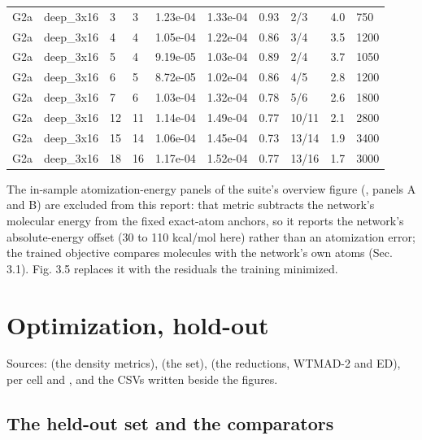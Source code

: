 \documentclass[10pt,a4paper]{article}
\begin{document}
\begin{landscape}
\begin{tiny}
\begin{longtable}{llllllllll}
G2a & deep\_3x16 & 3 & 3 & 1.23e-04 & 1.33e-04 & 0.93 & 2/3 & 4.0 & 750 \\
G2a & deep\_3x16 & 4 & 4 & 1.05e-04 & 1.22e-04 & 0.86 & 3/4 & 3.5 & 1200 \\
G2a & deep\_3x16 & 5 & 4 & 9.19e-05 & 1.03e-04 & 0.89 & 2/4 & 3.7 & 1050 \\
G2a & deep\_3x16 & 6 & 5 & 8.72e-05 & 1.02e-04 & 0.86 & 4/5 & 2.8 & 1200 \\
G2a & deep\_3x16 & 7 & 6 & 1.03e-04 & 1.32e-04 & 0.78 & 5/6 & 2.6 & 1800 \\
G2a & deep\_3x16 & 12 & 11 & 1.14e-04 & 1.49e-04 & 0.77 & 10/11 & 2.1 & 2800 \\
G2a & deep\_3x16 & 15 & 14 & 1.06e-04 & 1.45e-04 & 0.73 & 13/14 & 1.9 & 3400 \\
G2a & deep\_3x16 & 18 & 16 & 1.17e-04 & 1.52e-04 & 0.77 & 13/16 & 1.7 & 3000 \\
\bottomrule \end{longtable}
\end{tiny}
\end{landscape}


The in-sample atomization-energy panels of the suite's overview figure
(, panels A and B) are excluded from this report: that metric
subtracts the network's molecular energy from the fixed exact-atom anchors, so it reports the
network's absolute-energy offset (30 to 110 kcal/mol here) rather than an atomization error;
the trained objective compares molecules with the network's own atoms (Sec. 3.1). Fig. 3.5
replaces it with the residuals the training minimized.


\section{Optimization, hold-out}

Sources:  (the density metrics), 
(the set),  (the reductions, WTMAD-2 and ED),
per cell  and , and the CSVs written
beside the figures.

\subsection{The held-out set and the comparators}
\end{document}
